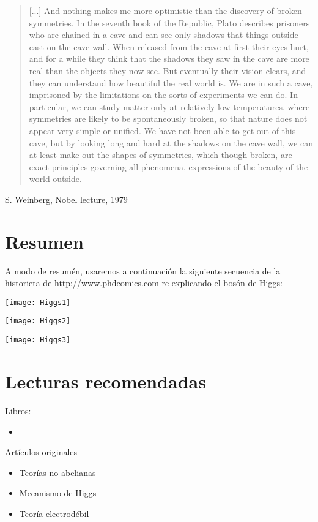 \begin{quote}
[...]  And
nothing makes me more optimistic than the discovery of broken symmetries.
In the seventh book of the Republic, Plato describes prisoners who are
chained in a cave and can see only shadows that things outside cast on the
cave wall. When released from the cave at first their eyes hurt, and for a
while they think that the shadows they saw in the cave are more real than
the objects they now see. But eventually their vision clears, and they can
understand how beautiful the real world is. We are in such a cave, imprisoned
by the limitations on the sorts of experiments we can do. In particular,
we can study matter only at relatively low temperatures, where symmetries
are likely to be spontaneously broken, so that nature does not appear
very simple or unified. We have not been able to get out of this cave, but by
looking long and hard at the shadows on the cave wall, we can at least make
out the shapes of symmetries, which though broken, are exact principles
governing all phenomena, expressions of the beauty of the world outside.
\end{quote}
S. Weinberg, Nobel lecture, 1979

\section{Resumen}
A modo de resumén, usaremos a continuación la siguiente secuencia de la historieta de \url{http://www.phdcomics.com} re-explicando el bosón de Higgs:
\newpage

\texttt{[image: Higgs1]}

\texttt{[image: Higgs2]}

\texttt{[image: Higgs3]}

\newpage


\section{Lecturas recomendadas}
Libros:
\begin{itemize}
\item \cite{kane,cottingham,Pich:2005mk}
\end{itemize}

Artículos originales

\begin{itemize}
\item Teorías no abelianas \cite{Yang:1954ek}
\item Mecanismo de Higgs \cite{Higgs:1964pj}
\item Teoría electrodébil \cite{Weinberg:1967tq}
\end{itemize}

%
